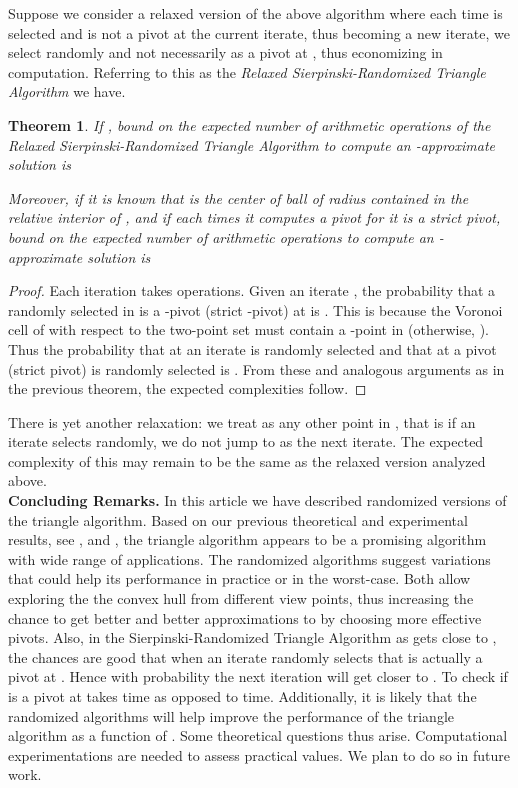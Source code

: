 \documentclass{article}
\newtheorem{thm}{Theorem}
\theoremstyle{definition}
\begin{document}
Suppose we consider a relaxed version of the above algorithm where each time  is selected and is not a pivot at the current iterate, thus becoming a new iterate, we select  randomly and not necessarily as a pivot at , thus economizing in computation.  Referring to this as the {\it Relaxed Sierpinski-Randomized Triangle Algorithm} we have.

\begin{thm} If , bound on the expected number of arithmetic operations of the Relaxed Sierpinski-Randomized Triangle Algorithm to compute an -approximate solution is

Moreover, if it is known that  is the center of ball of radius  contained in the relative interior of , and if each times it computes a pivot  for  it is a strict pivot, bound on the expected number of arithmetic operations to compute an -approximate solution is

\end{thm}
\begin{proof}  Each iteration takes  operations. Given an iterate ,  the probability that a randomly selected  in   is a -pivot (strict -pivot) at  is . This is because the Voronoi cell of  with respect to the two-point set  must contain a -point in  (otherwise, ). Thus the probability that at an iterate  is randomly selected and that at  a pivot (strict pivot) is randomly selected is . From these and analogous arguments as in the previous theorem, the expected complexities follow.
\end{proof}

There is yet another relaxation: we treat  as any other point in , that is if an iterate  selects  randomly,  we do not jump to  as the next iterate. The expected complexity of this may remain to be the same as the relaxed version analyzed above.\\

{\bf Concluding Remarks.} In this article we have described randomized versions of the triangle algorithm.  Based on our previous theoretical and experimental  results,  see \cite{kal14}, \cite{Meng} and \cite{Gibson}, the triangle algorithm appears to be a promising algorithm with wide range of applications.  The randomized algorithms suggest variations that could help its performance in practice or in the worst-case.  Both allow exploring the the convex hull from different view points, thus increasing the chance to get better and better approximations to  by choosing more effective pivots.  Also, in the Sierpinski-Randomized Triangle Algorithm as  gets close to , the chances are good that when an iterate  randomly selects  that  is actually a pivot at . Hence with probability  the next iteration will get closer to . To check if  is a pivot at  takes  time as opposed to  time. Additionally, it is likely that the randomized algorithms will help improve the performance of the triangle algorithm as a function of  .
Some theoretical questions thus arise. Computational experimentations are needed to assess practical values.  We plan to do so in future work.\\
\end{document}
